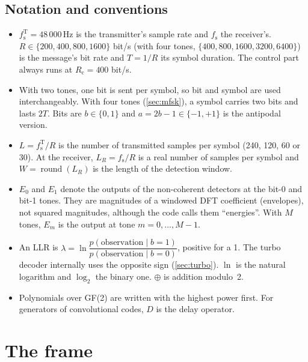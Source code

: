 \documentclass[11pt,a4paper]{article}
\newcommand{\Hz}{\,\mathrm{Hz}}
\newcommand{\round}[1]{\operatorname{round}\!\left(#1\right)}
\newcommand{\fsT}{f_{\mathrm{s}}^{\mathrm{T}}}
\newcommand{\fs}{f_{\mathrm{s}}}
\newcommand{\Rc}{R_{\mathrm{c}}}
\theoremstyle{remark}
\begin{document}
\subsection{Notation and conventions}
\begin{itemize}
\item $\fsT = 48\,000\Hz$ is the transmitter's sample rate and $\fs$ the receiver's. $R \in \{200, 400, 800, 1600\}$ bit/s (with four tones, $\{400, 800, 1600, 3200, 6400\}$) is the message's bit rate and $T = 1/R$ its symbol duration. The control part always runs at $\Rc = 400$ bit/s.
\item With two tones, one bit is sent per symbol, so bit and symbol are used interchangeably. With four tones (\cref{sec:mfsk}), a symbol carries two bits and lasts $2T$. Bits are $b \in \{0,1\}$ and $a = 2b-1 \in \{-1,+1\}$ is the antipodal version.
\item $L = \fsT / R$ is the number of transmitted samples per symbol (240, 120, 60 or 30). At the receiver, $L_R = \fs / R$ is a real number of samples per symbol and $W = \round{L_R}$ is the length of the detection window.
\item $E_0$ and $E_1$ denote the outputs of the non-coherent detectors at the bit-0 and bit-1 tones. They are magnitudes of a windowed DFT coefficient (envelopes), not squared magnitudes, although the code calls them ``energies''. With $M$ tones, $E_m$ is the output at tone $m = 0, \dots, M-1$.
\item An LLR is $\lambda = \ln \dfrac{p(\text{observation}\mid b=1)}{p(\text{observation}\mid b=0)}$, positive for a 1. The turbo decoder internally uses the opposite sign (\cref{sec:turbo}). $\ln$ is the natural logarithm and $\log_2$ the binary one. $\oplus$ is addition modulo~2.
\item Polynomials over GF(2) are written with the highest power first. For generators of convolutional codes, $D$ is the delay operator.
\end{itemize}

\section{The frame}
\label{sec:frame}
\end{document}
